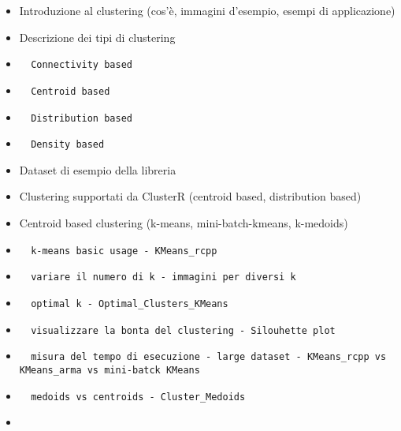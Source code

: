 \documentclass[
]{article}
\begin{document}
\begin{itemize}
\item
  Introduzione al clustering (cos'è, immagini d'esempio, esempi di
  applicazione)
\item
  Descrizione dei tipi di clustering
\item
\begin{verbatim}
  Connectivity based
\end{verbatim}
\item
\begin{verbatim}
  Centroid based
\end{verbatim}
\item
\begin{verbatim}
  Distribution based
\end{verbatim}
\item
\begin{verbatim}
  Density based
\end{verbatim}
\item
  Dataset di esempio della libreria
\item
  Clustering supportati da ClusterR (centroid based, distribution based)
\item
  Centroid based clustering (k-means, mini-batch-kmeans, k-medoids)
\item
\begin{verbatim}
  k-means basic usage - KMeans_rcpp
\end{verbatim}
\item
\begin{verbatim}
  variare il numero di k - immagini per diversi k
\end{verbatim}
\item
\begin{verbatim}
  optimal k - Optimal_Clusters_KMeans 
\end{verbatim}
\item
\begin{verbatim}
  visualizzare la bonta del clustering - Silouhette plot
\end{verbatim}
\item
\begin{verbatim}
  misura del tempo di esecuzione - large dataset - KMeans_rcpp vs KMeans_arma vs mini-batck KMeans
\end{verbatim}
\item
\begin{verbatim}
  medoids vs centroids - Cluster_Medoids
\end{verbatim}
\item

\end{itemize}
\end{document}
